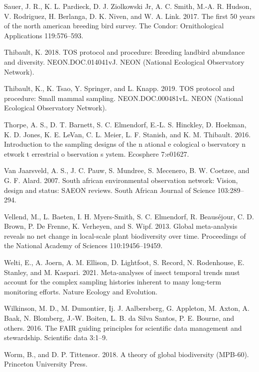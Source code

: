 \documentclass[
  12pt,
]{article}
\newlength{\cslhangindent}
\newlength{\cslentryspacingunit} %
\newenvironment{CSLReferences}[2] %
 {%
  \setlength{\parindent}{0pt}
  \ifodd #1
  \let\oldpar\par
  \def\par{\hangindent=\cslhangindent\oldpar}
  \fi
  \setlength{\parskip}{#2\cslentryspacingunit}
 }%
 {}
\begin{document}
\begin{CSLReferences}{1}{0}
\leavevmode{}%
Sauer, J. R., K. L. Pardieck, D. J. Ziolkowski Jr, A. C. Smith, M.-A. R. Hudson, V. Rodriguez, H. Berlanga, D. K. Niven, and W. A. Link. 2017. The first 50 years of the north american breeding bird survey. The Condor: Ornithological Applications 119:576--593.

\leavevmode{}%
Thibault, K. 2018. TOS protocol and procedure: Breeding landbird abundance and diversity. NEON.DOC.014041vJ. NEON (National Ecological Observatory Network).

\leavevmode{}%
Thibault, K., K. Tsao, Y. Springer, and L. Knapp. 2019. TOS protocol and procedure: Small mammal sampling. NEON.DOC.000481vL. NEON (National Ecological Observatory Network).

\leavevmode{}%
Thorpe, A. S., D. T. Barnett, S. C. Elmendorf, E.-L. S. Hinckley, D. Hoekman, K. D. Jones, K. E. LeVan, C. L. Meier, L. F. Stanish, and K. M. Thibault. 2016. Introduction to the sampling designs of the n ational e cological o bservatory n etwork t errestrial o bservation s ystem. Ecosphere 7:e01627.

\leavevmode{}%
Van Jaarsveld, A. S., J. C. Pauw, S. Mundree, S. Mecenero, B. W. Coetzee, and G. F. Alard. 2007. South african environmental observation network: Vision, design and status: SAEON reviews. South African Journal of Science 103:289--294.

\leavevmode{}%
Vellend, M., L. Baeten, I. H. Myers-Smith, S. C. Elmendorf, R. Beauséjour, C. D. Brown, P. De Frenne, K. Verheyen, and S. Wipf. 2013. Global meta-analysis reveals no net change in local-scale plant biodiversity over time. Proceedings of the National Academy of Sciences 110:19456--19459.

\leavevmode{}%
Welti, E., A. Joern, A. M. Ellison, D. Lightfoot, S. Record, N. Rodenhouse, E. Stanley, and M. Kaspari. 2021. Meta-analyses of insect temporal trends must account for the complex sampling histories inherent to many long-term monitoring efforts. Nature Ecology and Evolution.

\leavevmode{}%
Wilkinson, M. D., M. Dumontier, Ij. J. Aalbersberg, G. Appleton, M. Axton, A. Baak, N. Blomberg, J.-W. Boiten, L. B. da Silva Santos, P. E. Bourne, and others. 2016. The FAIR guiding principles for scientific data management and stewardship. Scientific data 3:1--9.

\leavevmode{}%
Worm, B., and D. P. Tittensor. 2018. A theory of global biodiversity (MPB-60). Princeton University Press.

\end{CSLReferences}
\end{document}
